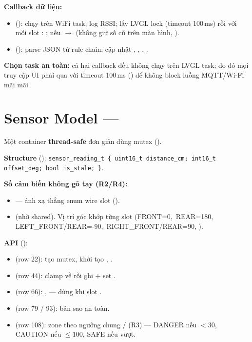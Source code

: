 \textbf{Callback dữ liệu:}
\begin{itemize}
\item {} (): chạy trên WiFi task; log RSSI;
  lấy LVGL lock (timeout 100\,ms) rồi với mỗi slot :
  ; nếu 
  $\rightarrow$  (không giữ số cũ trên
  màn hình, ).
\item {} (): parse JSON từ rule-chain; cập
  nhật , , , .
\end{itemize}

\noindent\textbf{Chọn task an toàn:} cả hai callback đều không chạy trên LVGL
task; do đó mọi truy cập UI phải qua  với
timeout 100\,ms () để không block luồng MQTT/Wi-Fi mãi mãi.

\section{Sensor Model — }
\label{sec:sensor-model}

Một container \textbf{thread-safe} đơn giản dùng mutex
().

\textbf{Structure} ():
\texttt{sensor\_reading\_t \{ uint16\_t distance\_cm; int16\_t offset\_deg;
bool is\_stale; \}}.

\textbf{Số cảm biến không gõ tay (R2/R4):}
\begin{itemize}
\item {} — ánh xạ thẳng enum wire slot
  ().
\item {}
  (nhờ  shared). Vị trí góc  khớp
  từng slot (FRONT=0,\, REAR=180,\, LEFT\_FRONT/REAR=-90,\,
  RIGHT\_FRONT/REAR=90, ).
\end{itemize}

\textbf{API} ():
\begin{itemize}
\item {} (row 22): tạo mutex, khởi tạo ,
  .
\item {} (row 44): clamp về
   rồi ghi + set
  .
\item {} (row 66): ,
   — dùng khi slot .
\item {} (row 79 / 93): bản sao an toàn.
\item {} (row 108): zone theo ngưỡng chung
   /  (R3) — DANGER nếu
  $< 30$, CAUTION nếu $\le 100$, SAFE nếu vượt.
\end{itemize}

